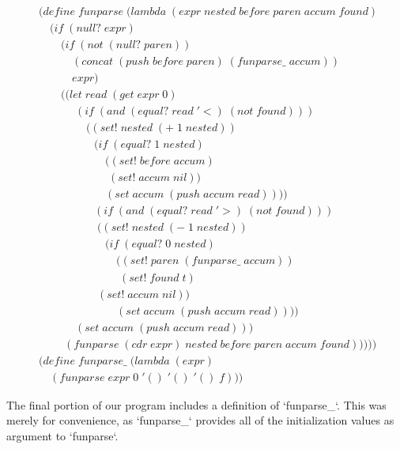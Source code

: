 \begin{align*}
& (define \; funparse \; (lambda \; (expr \; nested \; before \; paren \; accum \; found) \; 
\\& \quad (if \; (null? \; expr)
\\& \qquad (if \; (not \; (null? \; paren))
\\& \qquad \quad (concat \; (push \; before \; paren) \; (funparse\_ \; accum))
\\& \qquad \quad expr)
\\& \qquad ((let \; read \; (get \; expr \; 0)
\\& \qquad \quad \; (if \; (and \; (equal? \; read \; '<) \; (not \; found)))
\\& \qquad \qquad \; ((set! \; nested \; (+ \; 1 \; nested))
\\& \qquad \qquad \quad (if \; (equal? \; 1 \; nested)
\\& \qquad \qquad \qquad ((set! \; before \; accum)
\\& \qquad \qquad \qquad \; (set! \; accum \; nil))
\\& \qquad \qquad \qquad (set \; accum \; (push \; accum \; read))))
\\& \qquad \qquad \quad (if \; (and \; (equal? \; read \; '>) \; (not \; found)))
\\& \qquad \qquad \quad \; ((set! \; nested \; (- \; 1 \; nested))
\\& \qquad \qquad \qquad (if \; (equal? \; 0 \; nested)
\\& \qquad \qquad \qquad \quad ((set! \; paren \; (funparse\_ \; accum))
\\& \qquad \qquad \qquad \quad \; (set! \; found \; t)
\\& \qquad \qquad \quad \; (set! \; accum \; nil))
\\& \qquad \qquad \qquad \quad (set \; accum \; (push \; accum \; read))))
\\& \qquad \quad \; (set \; accum \; (push \; accum \; read)))
\\& \qquad \; (funparse \; (cdr \; expr) \; nested \; before \; paren \; accum \; found)))))
\\& (define \; funparse\_ \; (lambda \; (expr)
\\& \quad (funparse \; expr \; 0 \; '() \; '() \; '() \; f))) \; 
\end{align*}

The final portion of our program includes a definition of `funparse\_`. This was merely 
for convenience, as `funparse\_` provides all of the initialization values as argument 
to `funparse`.


